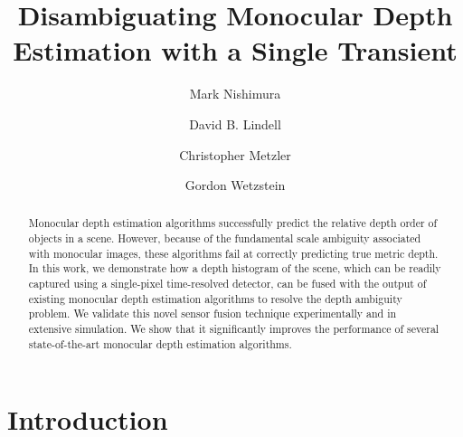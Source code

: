\documentclass[runningheads]{llncs}
\begin{document}
\pagestyle{headings}
\mainmatter
\def\ECCVSubNumber{3668}  %

\title{Disambiguating Monocular Depth Estimation with a Single Transient} %

%
\author{Mark Nishimura  \and
David B. Lindell \and
Christopher Metzler \and
Gordon Wetzstein}
%
%
\maketitle

\begin{abstract}
  Monocular depth estimation algorithms successfully predict the
  relative depth order of objects in a scene.
  However, because of the fundamental scale ambiguity associated with monocular
  images, these algorithms fail at correctly predicting true metric
  depth. In this work, we demonstrate how a depth histogram of the scene, which
  can be readily captured using a single-pixel time-resolved
    detector, can be fused with the output of existing monocular depth
  estimation algorithms to resolve the depth ambiguity problem.
  We validate this novel sensor fusion technique experimentally and in extensive
  simulation. We show that it significantly improves the performance of several
  state-of-the-art monocular depth estimation algorithms.  
\end{abstract}

\vspace{-5pt}
\section{Introduction}
\vspace{-5pt}
\label{sec:intro}

\end{document}
